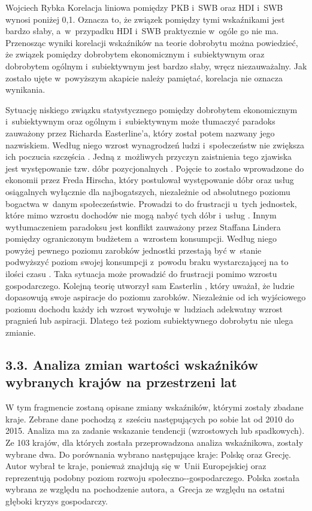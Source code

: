 \begin{artplenv}{Wojciech Rybka}
Korelacja liniowa pomiędzy PKB i~SWB oraz HDI i~SWB wynosi poniżej 0,1. Oznacza to, że związek pomiędzy tymi wskaźnikami
jest bardzo słaby, a~w~przypadku HDI i~SWB praktycznie w~ogóle go nie ma. Przenosząc wyniki korelacji wskaźników na
teorie dobrobytu można powiedzieć, że związek pomiędzy dobrobytem ekonomicznym i~subiektywnym oraz dobrobytem
ogólnym i~subiektywnym jest bardzo słaby, wręcz niezauważalny. Jak zostało ujęte w~powyższym akapicie należy pamiętać,
korelacja nie oznacza wynikania. 

Sytuację niskiego związku statystycznego pomiędzy dobrobytem ekonomicznym  i~subiektywnym oraz ogólnym i~subiektywnym
może tłumaczyć paradoks zauważony przez Richarda Easterline'a, który został potem nazwany jego nazwiskiem. Według niego
wzrost wynagrodzeń ludzi i~społeczeństw nie zwiększa ich poczucia szczęścia
\parencite{czapinski_ekonomia_2012}.
Jedną z~możliwych przyczyn zaistnienia tego zjawiska jest występowanie tzw. dóbr pozycjonalnych
\parencite{ostrowski_czy_2012}.
Pojęcie to zostało wprowadzone do ekonomii przez Freda Hirscha, który
postulował występowanie dóbr oraz usług osiągalnych wyłącznie dla najbogatszych, niezależnie od absolutnego poziomu
bogactwa w~danym społeczeństwie. Prowadzi to do frustracji u~tych jednostek, które mimo wzrostu dochodów nie mogą nabyć
tych dóbr i~usług
\parencite{hirsch_social_2005}.
Innym wytłumaczeniem paradoksu jest konflikt zauważony przez
Staffana Lindera pomiędzy ograniczonym budżetem a~wzrostem konsumpcji. Według niego powyżej pewnego poziomu zarobków
jednostki przestają być w~stanie podwyższyć poziom swojej konsumpcji z~powodu braku wystarczającej na to ilości czasu
\parencite{linder_harried_1970}.
Taka sytuacja może prowadzić do frustracji pomimo wzrostu gospodarczego.
Kolejną teorię utworzył sam Easterlin
\parencite{easterlin_income_2001},
który uważał, że ludzie dopasowują swoje
aspiracje do poziomu zarobków. Niezależnie od ich wyjściowego poziomu dochodu każdy ich wzrost wywołuje w~ludziach
adekwatny wzrost pragnień lub aspiracji. Dlatego też poziom subiektywnego dobrobytu nie ulega zmianie.

\subsection{3.3. Analiza zmian wartości wskaźników wybranych krajów na przestrzeni lat}
W tym fragmencie zostaną opisane zmiany wskaźników, którymi zostały zbadane kraje. Zebrane dane pochodzą z~sześciu
następujących po sobie lat od 2010 do 2015. Analiza ma za zadanie wskazanie tendencji (wzrostowych lub spadkowych). Ze
103 krajów, dla których została przeprowadzona analiza wskaźnikowa, zostały wybrane dwa. Do porównania wybrano
następujące kraje: Polskę oraz Grecję. Autor wybrał te kraje, ponieważ znajdują się w~Unii Europejskiej oraz
reprezentują podobny poziom rozwoju społeczno-\mbox{-gospodarczego}. Polska została wybrana ze względu na pochodzenie autora,
a~Grecja ze względu na ostatni głęboki kryzys gospodarczy. 


\end{artplenv}
